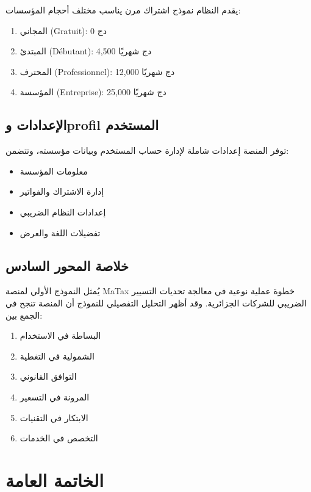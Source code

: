 \documentclass[12pt, a4paper, twoside]{report}
\begin{document}
يقدم النظام نموذج اشتراك مرن يناسب مختلف أحجام المؤسسات:
\begin{enumerate}
    \item المجاني (Gratuit): 0 دج
    \item المبتدئ (Débutant): 4,500 دج شهريًا
    \item المحترف (Professionnel): 12,000 دج شهريًا
    \item المؤسسة (Entreprise): 25,000 دج شهريًا
\end{enumerate}

\section{الإعدادات وprofil المستخدم}

توفر المنصة إعدادات شاملة لإدارة حساب المستخدم وبيانات مؤسسته، وتتضمن:
\begin{itemize}
    \item معلومات المؤسسة
    \item إدارة الاشتراك والفواتير
    \item إعدادات النظام الضريبي
    \item تفضيلات اللغة والعرض
\end{itemize}

\section{خلاصة المحور السادس}

يُمثل النموذج الأولي لمنصة MaTax خطوة عملية نوعية في معالجة تحديات التسيير الضريبي للشركات الجزائرية. وقد أظهر التحليل التفصيلي للنموذج أن المنصة تنجح في الجمع بين:
\begin{enumerate}
    \item البساطة في الاستخدام
    \item الشمولية في التغطية
    \item التوافق القانوني
    \item المرونة في التسعير
    \item الابتكار في التقنيات
    \item التخصص في الخدمات
\end{enumerate}

\newpage

\chapter{الخاتمة العامة}
\end{document}
